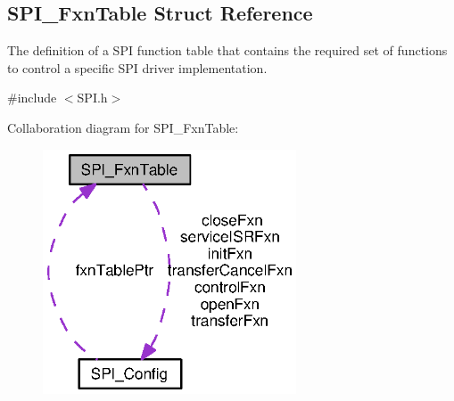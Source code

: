 \subsection{S\+P\+I\+\_\+\+Fxn\+Table Struct Reference}
\label{struct_s_p_i___fxn_table}


The definition of a S\+P\+I function table that contains the required set of functions to control a specific S\+P\+I driver implementation.  




{\ttfamily \#include $<$S\+P\+I.\+h$>$}



Collaboration diagram for S\+P\+I\+\_\+\+Fxn\+Table\+:
\nopagebreak
\begin{figure}[H]
\begin{center}
\leavevmode
\includegraphics[width=213pt]{struct_s_p_i___fxn_table__coll__graph}
\end{center}
\end{figure}
